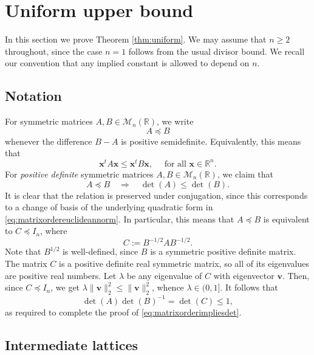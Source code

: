 \documentclass[11pt,reqno]{amsart}
\theoremstyle{definition}
\theoremstyle{remark}
\numberwithin{equation}{section}
\numberwithin{thm}{section}
\numberwithin{table}{section}
\def \R {{\mathbb R}}
\newcommand{\x}{\mathbf{x}}
\begin{document}
\section{Uniform upper bound}

In this section we prove Theorem \ref{thm:uniform}. 
We may assume that $n \ge 2$ throughout, since the case $n=1$ follows from the usual divisor bound.  We recall our convention that any implied constant is allowed to depend on $n$. 
 
\subsection{Notation}
For symmetric matrices
$A,B \in \mathcal{M}_n(\R)$, we write 
\begin{equation}\label{def:matrixorder}
     A \preceq B
\end{equation}
whenever the difference $B-A$ is positive semidefinite. Equivalently, this means that 
\begin{equation}\label{eq:matrixordereuclideannorm}
        \x^t A \x \le \x^t B \x,\quad  \text{ for all }  \x \in \R^n.
\end{equation}
For {\it positive  definite} symmetric matrices $A,B \in \mathcal{M}_n(\R)$, we claim that 
\begin{equation}\label{eq:matrixorderimpliesdet}
    A \preceq B \quad \Rightarrow \quad \det(A) \le \det(B).
\end{equation}
It is clear that the relation is preserved under conjugation, since this corresponds to a change of basis of the underlying quadratic form in \eqref{eq:matrixordereuclideannorm}. In particular, this means that $A \preceq B$ is equivalent to $C\preceq I_n$, where
\[
   C:= B^{-1/2} A B^{-1/2}.
\]
Note that $B^{1/2}$ is well-defined, since $B$ is a symmetric positive definite matrix. 
The matrix $C$ is a positive definite real symmetric matrix, so all of its eigenvalues are positive real numbers. Let $\lambda$ be any eigenvalue of $C$ with eigenvector $\mathbf{v}$. Then, since $C \preceq I_n$, we get 
$ \lambda \| \mathbf{v} \|_2^2 \le  \| \mathbf{v} \|_2^2$, whence $\lambda \in (0,1]$. It follows that 
\[
    \det(A) \det(B)^{-1} =  \det(C) \le 1,
\]
as required to complete the proof of \eqref{eq:matrixorderimpliesdet}.


\subsection{Intermediate lattices}
\label{section:intermediate_lattices}
\end{document}
